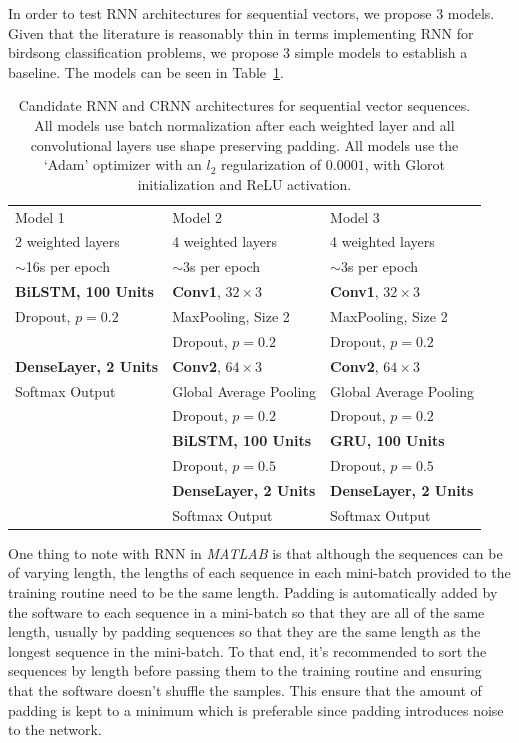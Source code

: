 In order to test RNN architectures for sequential vectors, we propose 3 models.
Given that the literature is reasonably thin in terms implementing RNN for
birdsong classification problems, we propose 3 simple models to establish a
baseline. The models can be seen in Table~\ref{table:rnn_seq_vector}.

\begin{table}[ht]
\begin{center}
\begin{tabular}{l l l}
\toprule
Model 1 & Model 2 & Model 3 \\ [0.5ex]
2 weighted layers & 4 weighted layers & 4 weighted layers \\[0.5ex]
$\sim$16s per epoch & $\sim$3s per epoch & $\sim$3s per epoch \\[0.5ex]
\midrule
\textbf{BiLSTM, 100 Units} & \textbf{Conv1}, $32 \times 3$ & \textbf{Conv1}, $32 \times 3$ \\
Dropout, $p=0.2$ & MaxPooling, Size 2 & MaxPooling, Size 2 \\
& Dropout, $p=0.2$ & Dropout, $p=0.2$ \\[1ex]
\textbf{DenseLayer, 2 Units} & \textbf{Conv2}, $64 \times 3$ & \textbf{Conv2}, $64 \times 3$ \\
Softmax Output & Global Average Pooling & Global Average Pooling \\
& Dropout, $p=0.2$ & Dropout, $p=0.2$ \\[1ex]
& \textbf{BiLSTM, 100 Units} & \textbf{GRU, 100 Units} \\
& Dropout, $p=0.5$  & Dropout, $p=0.5$  \\[1ex]
& \textbf{DenseLayer, 2 Units} & \textbf{DenseLayer, 2 Units} \\
& Softmax Output & Softmax Output \\
\bottomrule
\end{tabular}
\caption{Candidate RNN and CRNN architectures for sequential vector sequences.
  All models use batch normalization after each weighted layer and all
convolutional layers use shape preserving padding. All models use the `Adam'
optimizer with an $l_2$ regularization of $0.0001$, with Glorot initialization
and ReLU activation.}\label{table:rnn_seq_vector}
\end{center}
\end{table}

One thing to note with RNN in \textit{MATLAB} is that although the sequences can
be of varying length, the lengths of each sequence in each mini-batch provided
to the training routine need to be the same length. Padding is automatically
added by the software to each sequence in a mini-batch so that they are all of
the same length, usually by padding sequences so that they are the same length
as the longest sequence in the mini-batch. To that end, it's recommended to sort
the sequences by length before passing them to the training routine and ensuring
that the software doesn't shuffle the samples. This ensure that the amount of
padding is kept to a minimum which is preferable since padding introduces noise
to the network.

